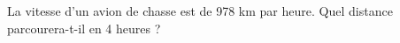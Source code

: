 \documentclass[exercice]{thedocument}%
\begin{document}
%
La vitesse d'un avion de chasse est de 978 km par heure. Quel distance
parcourera-t-il en 4 heures ?
\end{document}
